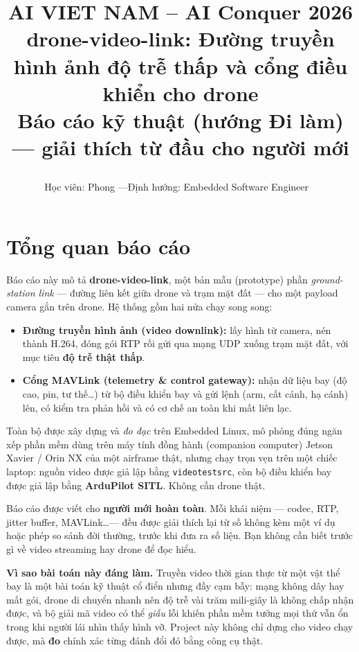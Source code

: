 \documentclass[12pt]{ai_conquer2026}
\title{%
  \begin{center}
        \Large {AI VIET NAM -- AI Conquer 2026}\\[.5ex]
        \Huge \textbf{drone-video-link: Đường truyền hình ảnh độ trễ thấp và cổng điều khiển cho drone}\\[.5ex]
        \large Báo cáo kỹ thuật (hướng Đi làm) --- giải thích từ đầu cho người mới\\[.5ex]
  \end{center}
}
\author{
\begin{minipage}{\textwidth}
\centering
{
\vspace{-1.5em}
Học viên: Phong \quad---\quad Định hướng: Embedded Software Engineer
}\
\end{minipage}
}
\date{}
\begin{document}
\maketitle
\vspace{-5.5em}
\setlength{\epigraphwidth}{0.6\textwidth}

\section{Tổng quan báo cáo}

Báo cáo này mô tả \textbf{drone-video-link}, một bản mẫu (prototype) phần
\emph{ground-station link} --- đường liên kết giữa drone và trạm mặt đất --- cho
một payload camera gắn trên drone. Hệ thống gồm hai nửa chạy song song:

\begin{itemize}
\item \textbf{Đường truyền hình ảnh (video downlink):} lấy hình từ camera, nén
      thành H.264, đóng gói RTP rồi gửi qua mạng UDP xuống trạm mặt đất, với mục
      tiêu \textbf{độ trễ thật thấp}.
\item \textbf{Cổng MAVLink (telemetry \& control gateway):} nhận dữ liệu bay
      (độ cao, pin, tư thế\ldots) từ bộ điều khiển bay và gửi lệnh (arm, cất
      cánh, hạ cánh) lên, có kiểm tra phản hồi và có cơ chế an toàn khi mất liên
      lạc.
\end{itemize}

Toàn bộ được xây dựng và \emph{đo đạc} trên Embedded Linux, mô phỏng đúng ngăn
xếp phần mềm dùng trên máy tính đồng hành (companion computer) Jetson Xavier /
Orin NX của một airframe thật, nhưng chạy trọn vẹn trên một chiếc laptop: nguồn
video được giả lập bằng \texttt{videotestsrc}, còn bộ điều khiển bay được giả
lập bằng \textbf{ArduPilot SITL}. Không cần drone thật.

\begin{aivncodebox}
Báo cáo được viết cho \textbf{người mới hoàn toàn}. Mỗi khái niệm --- codec,
RTP, jitter buffer, MAVLink\ldots --- đều được giải thích lại từ số không kèm
một ví dụ hoặc phép so sánh đời thường, trước khi đưa ra số liệu. Bạn không cần
biết trước gì về video streaming hay drone để đọc hiểu.
\end{aivncodebox}

\textbf{Vì sao bài toán này đáng làm.} Truyền video thời gian thực từ một vật thể
bay là một bài toán kỹ thuật cổ điển nhưng đầy cạm bẫy: mạng không dây hay mất
gói, drone di chuyển nhanh nên độ trễ vài trăm mili-giây là không chấp nhận
được, và bộ giải mã video có thể \emph{giấu} lỗi khiến phần mềm tưởng mọi thứ
vẫn ổn trong khi người lái nhìn thấy hình vỡ. Project này không chỉ dựng cho
video chạy được, mà \textbf{đo} chính xác từng đánh đổi đó bằng công cụ thật.
\end{document}
